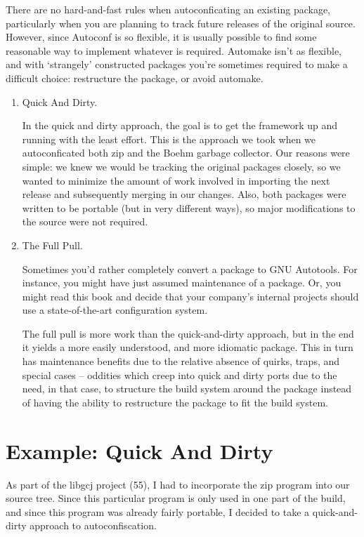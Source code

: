 There are no hard-and-fast rules when autoconficating an existing package, particularly when you are planning to track future releases of the original source. However, since Autoconf is so flexible, it is usually possible to find some reasonable way to implement whatever is required. Automake isn't as flexible, and with `strangely' constructed packages you're sometimes required to make a difficult choice: restructure the package, or avoid automake. 

\begin{enumerate}
\item Quick And Dirty.

In the quick and dirty approach, the goal is to get the framework up and running with the least effort. This is the approach we took when we autoconficated both zip and the Boehm garbage collector. Our reasons were simple: we knew we would be tracking the original packages closely, so we wanted to minimize the amount of work involved in importing the next release and subsequently merging in our changes. Also, both packages were written to be portable (but in very different ways), so major modifications to the source were not required.

\item The Full Pull.

Sometimes you'd rather completely convert a package to GNU Autotools. For instance, you might have just assumed maintenance of a package. Or, you might read this book and decide that your company's internal projects should use a state-of-the-art configuration system.

The full pull is more work than the quick-and-dirty approach, but in the end it yields a more easily understood, and more idiomatic package. This in turn has maintenance benefits due to the relative absence of quirks, traps, and special cases -- oddities which creep into quick and dirty ports due to the need, in that case, to structure the build system around the package instead of having the ability to restructure the package to fit the build system. 
\end{enumerate}

\section{Example: Quick And Dirty}

As part of the libgcj project (55), I had to incorporate the zip program into our source tree. Since this particular program is only used in one part of the build, and since this program was already fairly portable, I decided to take a quick-and-dirty approach to autoconfiscation.

